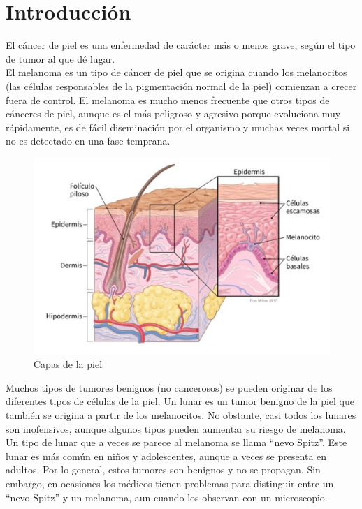 \section{Introducción}
El cáncer de piel es una enfermedad de carácter más o menos grave, según el tipo de tumor al que dé lugar. \\
El melanoma es un tipo de cáncer de piel que se origina cuando los melanocitos (las células responsables de la pigmentación normal de la piel) comienzan a crecer fuera de control. El melanoma es mucho menos frecuente que otros tipos de cánceres de piel, aunque es el más peligroso y agresivo porque evoluciona muy rápidamente, es de fácil diseminación por el organismo y muchas veces mortal si no es detectado en una fase temprana. 
\bigskip

\begin{figure}[htbp]
    \centering
    \textbf{}\par\medskip
    \includegraphics[scale=0.70]{figures/skin.png}
    \caption{Capas de la piel}
\end{figure}

\pagestyle{fancy}
\fancyhf{}
\newpage
Muchos tipos de tumores benignos (no cancerosos) se pueden originar de los diferentes tipos de células de la piel. Un lunar es un tumor benigno de la piel que también se origina a partir de los melanocitos. No obstante, casi todos los lunares son inofensivos, aunque algunos tipos pueden aumentar su riesgo de melanoma. \\
Un tipo de lunar que a veces se parece al melanoma se llama “nevo Spitz”. Este lunar es más común en niños y adolescentes, aunque a veces se presenta en adultos. Por lo general, estos tumores son benignos y no se propagan. Sin embargo, en ocasiones los médicos tienen problemas para distinguir entre un “nevo Spitz” y un melanoma, aun cuando los observan con un microscopio.

